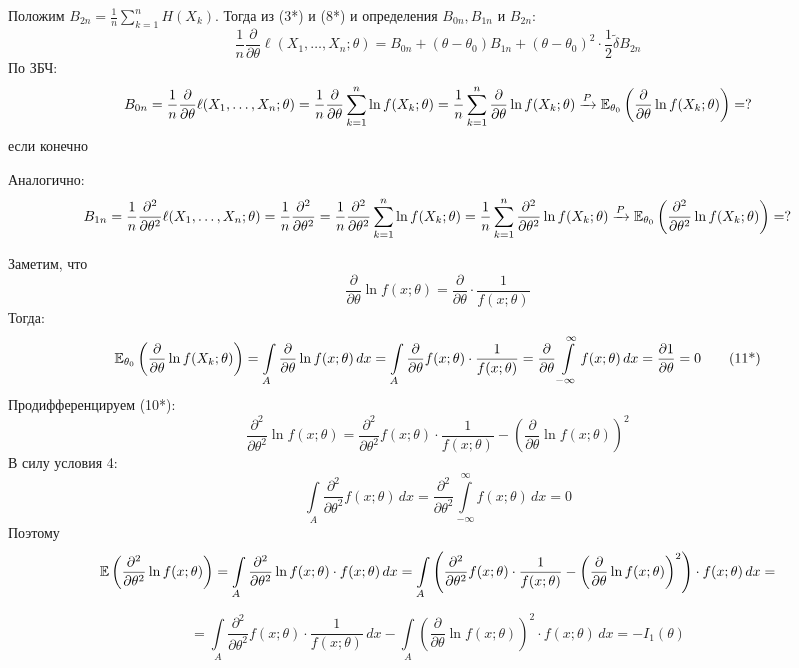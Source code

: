 {    Положим $B_{2n} = \displaystyle \frac{1}{n}\sum_{k=1}^{n} H(X_k)$. Тогда из (3*) и (8*) и определения $B_{0n}, B_{1n}$ и $B_{2n}$:
    \[\frac{1}{n}\frac{\partial}{\partial\theta}\ell(X_1,\dots, X_n;\theta) = B_{0n} + (\theta - \theta_0)B_{1n} + (\theta - \theta_0)^2\cdot \frac{1}{2}\widetilde{\delta}B_{2n} \tag{9*}\]
    По ЗБЧ:
    \[B_{0n} = \frac{1}{n}\frac{\partial}{\partial\theta}\ell(X_1,\dots, X_n;\theta) = \frac{1}{n}\frac{\partial}{\partial\theta}\sum_{k=1}^{n}\ln f(X_k;\theta) = \frac{1}{n}\sum_{k=1}^{n}\frac{\partial}{\partial\theta}\ln f(X_k;\theta) \xrightarrow{P} \mathbb{E}_{\theta_0}\left(\frac{\partial}{\partial\theta}\ln f(X_k;\theta)\right) = ?\]
    если конечно

    Аналогично:
    \[B_{1n} = \frac{1}{n}\frac{\partial^2}{\partial\theta^2}\ell(X_1,\dots,X_n;\theta) = \frac{1}{n}\frac{\partial^2}{\partial\theta^2} = \frac{1}{n}\frac{\partial^2}{\partial\theta^2}\sum_{k=1}^{n}\ln f(X_k;\theta) = \frac{1}{n}\sum_{k=1}^{n}\frac{\partial^2}{\partial\theta^2}\ln f(X_k;\theta) \xrightarrow{P} \mathbb{E}_{\theta_0}\left(\frac{\partial^2}{\partial\theta^2}\ln f(X_k;\theta)\right) = ?\]

    Заметим, что
    \[\frac{\partial}{\partial\theta} \ln f(x; \theta) = \frac{\partial}{\partial\theta} \cdot \frac{1}{f(x;\theta)} \tag{10*}\]
    Тогда:
    \[\mathbb{E}_{\theta_0}\left(\frac{\partial}{\partial\theta}\ln f(X_k;\theta)\right) = \int\limits_A \frac{\partial}{\partial\theta}\ln f(x;\theta)\,dx = \int\limits_A \frac{\partial}{\partial\theta} f(x;\theta) \cdot \frac{1}{f(x;\theta)} = \frac{\partial}{\partial\theta}\int\limits_{-\infty}^\infty f(x;\theta)\,dx = \frac{\partial 1}{\partial\theta} = 0 \tag{11*}\]
    Продифференцируем (10*):
    \[\frac{\partial^2}{\partial\theta^2} \ln f(x; \theta) = \frac{\partial^2}{\partial\theta^2} f(x; \theta) \cdot \frac{1}{f(x;\theta)} - \left(\frac{\partial}{\partial\theta}\ln f(x;\theta)\right)^2 \tag{12*}\]
    В силу условия 4:
    \[\int\limits_A \frac{\partial^2}{\partial\theta^2}f(x; \theta)\,dx = \frac{\partial^2}{\partial\theta^2}\int\limits_{-\infty}^\infty f(x;\theta)\,dx = 0 \tag{15*}\]
    Поэтому
    \[\mathbb{E}\left(\frac{\partial^2}{\partial\theta^2} \ln f(x; \theta)\right) = \int\limits_A \frac{\partial^2}{\partial\theta^2} \ln f(x; \theta) \cdot f(x;\theta)\,dx = \int\limits_A \left(\frac{\partial^2}{\partial\theta^2} f(x; \theta) \cdot \frac{1}{f(x;\theta)} - \left(\frac{\partial}{\partial\theta}\ln f(x;\theta)\right)^2\right) \cdot f(x;\theta)\,dx =\]

    \[= \int\limits_A\frac{\partial^2}{\partial\theta^2} f(x; \theta) \cdot \frac{1}{f(x;\theta)}\,dx - \int\limits_A \left(\frac{\partial}{\partial\theta}\ln f(x;\theta)\right)^2\cdot f(x;\theta)\,dx = -I_1(\theta) \tag{16*}\]

}
